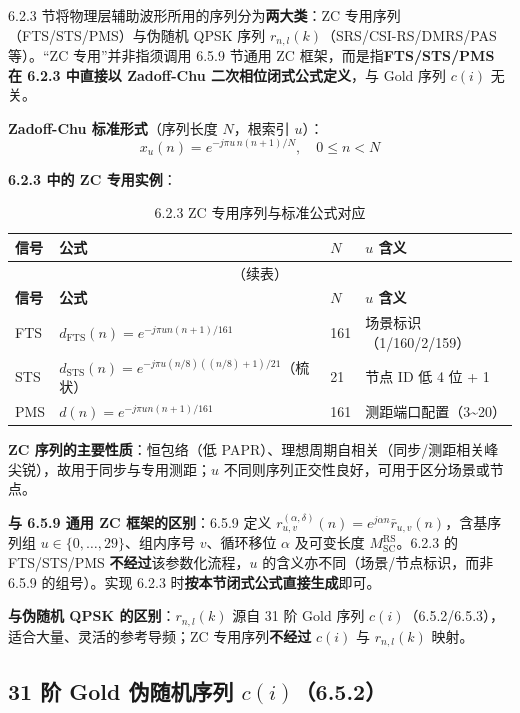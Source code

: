 \documentclass[11pt,a4paper]{ctexart}
\begin{document}
6.2.3 节将物理层辅助波形所用的序列分为\textbf{两大类}：ZC 专用序列（FTS/STS/PMS）与伪随机 QPSK 序列 $r_{n,l}(k)$（SRS/CSI-RS/DMRS/PAS 等）。``ZC 专用''并非指须调用 6.5.9 节通用 ZC 框架，而是指\textbf{FTS/STS/PMS 在 6.2.3 中直接以 Zadoff-Chu 二次相位闭式公式定义}，与 Gold 序列 $c(i)$ 无关。

\textbf{Zadoff-Chu 标准形式}（序列长度 $N$，根索引 $u$）：
\begin{equation}
x_u(n) = e^{-j\pi u\, n(n+1)/N}, \quad 0 \leq n < N
\end{equation}

\textbf{6.2.3 中的 ZC 专用实例}：
\begin{longtable}{llll}
\caption{6.2.3 ZC 专用序列与标准公式对应} \\
\toprule
\textbf{信号} & \textbf{公式} & \textbf{$N$} & \textbf{$u$ 含义} \\
\midrule
\endfirsthead
\multicolumn{4}{c}{\small（续表）} \\
\toprule
\textbf{信号} & \textbf{公式} & \textbf{$N$} & \textbf{$u$ 含义} \\
\midrule
\endhead
\bottomrule
\endfoot
FTS & $d_{\mathrm{FTS}}(n)=e^{-j\pi u n(n+1)/161}$ & 161 & 场景标识（1/160/2/159） \\
STS & $d_{\mathrm{STS}}(n)=e^{-j\pi u (n/8)((n/8)+1)/21}$（梳状） & 21 & 节点 ID 低 4 位 + 1 \\
PMS & $d(n)=e^{-j\pi u n(n+1)/161}$ & 161 & 测距端口配置（3\textasciitilde 20） \\
\end{longtable}

\textbf{ZC 序列的主要性质}：恒包络（低 PAPR）、理想周期自相关（同步/测距相关峰尖锐），故用于同步与专用测距；$u$ 不同则序列正交性良好，可用于区分场景或节点。

\textbf{与 6.5.9 通用 ZC 框架的区别}：6.5.9 定义 $r_{u,v}^{(\alpha,\delta)}(n)=e^{j\alpha n}\bar r_{u,v}(n)$，含基序列组 $u\in\{0,\ldots,29\}$、组内序号 $v$、循环移位 $\alpha$ 及可变长度 $M_{\mathrm{SC}}^{\mathrm{RS}}$。6.2.3 的 FTS/STS/PMS \textbf{不经过}该参数化流程，$u$ 的含义亦不同（场景/节点标识，而非 6.5.9 的组号）。实现 6.2.3 时\textbf{按本节闭式公式直接生成}即可。

\textbf{与伪随机 QPSK 的区别}：$r_{n,l}(k)$ 源自 31 阶 Gold 序列 $c(i)$（6.5.2/6.5.3），适合大量、灵活的参考导频；ZC 专用序列\textbf{不经过} $c(i)$ 与 $r_{n,l}(k)$ 映射。

\subsection{31 阶 Gold 伪随机序列 $c(i)$（6.5.2）}
\end{document}
